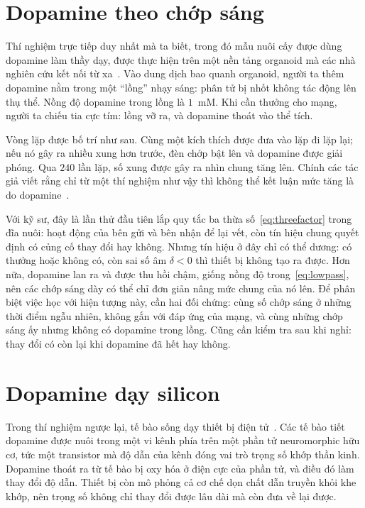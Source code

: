 \section{Dopamine theo chớp sáng}
\label{sec:dishdopamine}

Thí nghiệm trực tiếp duy nhất mà ta biết, trong đó mẫu nuôi cấy được dùng dopamine làm thầy dạy, được thực hiện trên một nền tảng organoid mà các nhà nghiên cứu kết nối từ xa~\cite{Jordan2024}. Vào dung dịch bao quanh organoid, người ta thêm dopamine nằm trong một ``lồng'' nhạy sáng: phân tử bị nhốt không tác động lên thụ thể. Nồng độ dopamine trong lồng là $1$~mM. Khi cần thưởng cho mạng, người ta chiếu tia cực tím: lồng vỡ ra, và dopamine thoát vào thể tích.

Vòng lặp được bố trí như sau. Cùng một kích thích được đưa vào lặp đi lặp lại; nếu nó gây ra nhiều xung hơn trước, đèn chớp bật lên và dopamine được giải phóng. Qua $240$ lần lặp, số xung được gây ra nhìn chung tăng lên. Chính các tác giả viết rằng chỉ từ một thí nghiệm như vậy thì không thể kết luận mức tăng là do dopamine~\cite{Jordan2024}.

Với kỹ sư, đây là lần thử đầu tiên lắp quy tắc ba thừa số~\eqref{eq:threefactor} trong đĩa nuôi: hoạt động của bên gửi và bên nhận để lại vết, còn tín hiệu chung quyết định có củng cố thay đổi hay không. Nhưng tín hiệu ở đây chỉ có thể dương: có thưởng hoặc không có, còn sai số âm $\delta<0$ thì thiết bị không tạo ra được. Hơn nữa, dopamine lan ra và được thu hồi chậm, giống nồng độ trong~\eqref{eq:lowpass}, nên các chớp sáng dày có thể chỉ đơn giản nâng mức chung của nó lên. Để phân biệt việc học với hiện tượng này, cần hai đối chứng: cùng số chớp sáng ở những thời điểm ngẫu nhiên, không gắn với đáp ứng của mạng, và cùng những chớp sáng ấy nhưng không có dopamine trong lồng. Cũng cần kiểm tra sau khi nghỉ: thay đổi có còn lại khi dopamine đã hết hay không.

\section{Dopamine dạy silicon}
\label{sec:biohybrid}

Trong thí nghiệm ngược lại, tế bào sống dạy thiết bị điện tử~\cite{Keene2020}. Các tế bào tiết dopamine được nuôi trong một vi kênh phía trên một phần tử neuromorphic hữu cơ, tức một transistor mà độ dẫn của kênh đóng vai trò trọng số khớp thần kinh. Dopamine thoát ra từ tế bào bị oxy hóa ở điện cực của phần tử, và điều đó làm thay đổi độ dẫn. Thiết bị còn mô phỏng cả cơ chế dọn chất dẫn truyền khỏi khe khớp, nên trọng số không chỉ thay đổi được lâu dài mà còn đưa về lại được.


